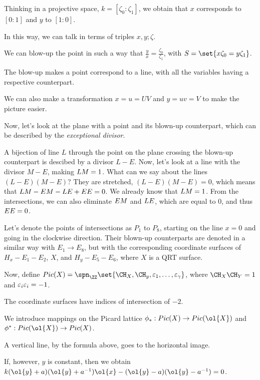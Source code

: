 \documentclass[11pt]{scrartcl}
\begin{document}
  Thinking in a projective space, $k = [\zeta_{0}:\zeta_{1}]$, we
  obtain that $x$ corresponds to $[0:1]$ and $y$ to $[1:0]$.

  In this way, we can talk in terms of triples $x, y; \zeta$.

  We can blow-up the point in such a way that
  $\frac{y}{x} = \frac{\zeta_{0}}{\zeta_{1}}$, with
  $S = \set{x\zeta_{0} = y\zeta_{1}}$.

  The blow-up makes a point correspond to a line, with all the
  variables having a respective counterpart.

  We can also make a transformation $x = u = UV$ and $y = uv = V$ to
  make the picture easier.

  Now, let's look at the plane with a point and its blown-up counterpart,
  which can be described by the \textit{exceptional divisor}.

  A bijection of line $L$ through the point on the plane crossing the
  blown-up counterpart is descibed by a divisor $L-E$. Now, let's look
  at a line with the divisor $M-E$, making $L \* M = 1$. What can we
  say about the lines $(L-E)(M-E)$? They are stretched,
  $(L-E)(M-E) = 0$, which means that
  $L\* M - E\* M - L\* E + E\* E = 0$. We already know that
  $L\* M = 1$. From the intersections, we can also eliminate $E\*M$
  and $L\* E$, which are equal to 0, and thus $E\* E = 0$.

  Let's denote the points of intersections as $P_{1}$ to $P_{8}$,
  starting on the line $x=0$ and going in the clockwise direction.
  Their blown-up counterparts are denoted in a similar way with
  $E_{1} \to E_{8}$, but with the corresponding coordinate surfaces of
  $H_{x} - E_{1} - E_{2}$, $X$, and $H_{y} - E_{5} - E_{6}$, where $X$
  is a QRT surface.

  Now, define
  $Pic(X) = \spn_{\ZZ}\set{\CH_{X}, \CH_{y}, \varepsilon_{1}, \dots,
    \varepsilon_{\gamma}}$, where $\CH_{X} \* \CH_{Y} = 1$ and
  $\varepsilon_{i}\*\varepsilon_{i} = -1$.

  The coordinate surfaces have indices of intersection of $-2$.

  We introduce mappings on the Picard lattice
  $\phi_{*}:Pic(X) \to Pic(\ol{X})$ and
  $\phi^{*}: Pic(\ol{X}) \to Pic(X)$.

  A vertical line, by the formula above, goes to the horizontal image.

  If, however, $y$ is constant, then we obtain
  $ k(\ol{y}+a)(\ol{y}+a^{-1})\ol{x} - (\ol{y}-a)(\ol{y}-a^{-1}) = 0$.
\end{document}
